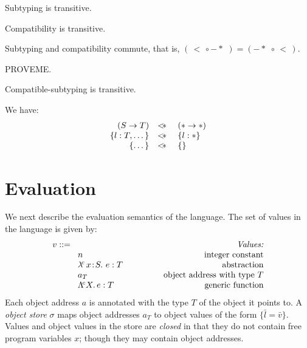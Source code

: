 \documentclass{article}
\newcommand{\myclearpage}{}
\renewcommand{\myclearpage}{\clearpage}
\newcommand{\lam}[5]{\lambda\!^{#1}\,#2\!:\!#3.\,\,#5:#4}
\newcommand{\lamt}[2]{#1\rightarrow #2}
\newcommand{\dynamic}{\t{*}}
\newcommand{\Lam}[4]{\Lambda\!^{#1} #2.\,#3:#4}
\newcommand{\subtypeword}{\,<\,}
\newcommand{\subtype}[2]{#1 \subtypeword #2}
\newcommand{\compatible}[2]{#1 \leadsto #2}
\renewcommand{\compatible}[2]{#1 -\!\!\!*\,\, #2}
\newcommand{\comsubtype}[2]{#1 <\!\!\leadsto #2}
\renewcommand{\comsubtype}[2]{#1 <\!\!\!*\,\, #2}
\renewcommand{\t}[1]{{\tt #1}}
\newcommand{\objty}[1]{\{#1\}}
\newcommand{\objv}[1]{\{#1\}}
\begin{document}
 
\begin{lemma}
Subtyping is transitive.
\end{lemma}
\begin{lemma}
Compatibility is transitive.
\end{lemma}
\begin{lemma}
Subtyping and compatibility commute, that is, $(\subtype{}{}\circ \compatible{}{} )=( \compatible{}{}\circ \subtype{}{})$.
\end{lemma}
PROVEME.
\begin{lemma}
Compatible-subtyping is transitive.
\end{lemma}


We have:
\[
\begin{array}{rcl}
	(\lamt{S}{T})  		&\comsubtype{}{}&  (\lamt\dynamic\dynamic) \\
	\objty{l:T,\dots}		& \comsubtype{}{}&  \objty{l:\dynamic} \\
	\objty{\dots}	   	& \comsubtype{}{}&  \objty{} \\
\end{array}
\]

\myclearpage
\section{Evaluation}

We next describe the evaluation semantics of the language. 
The set of values in the language is given by:
\[
\begin{array}{llr}
	\mydefhead{v ::=\qquad\qquad\qquad\qquad\qquad}{Values:} 
	\mydefcase{n								}{integer constant} 
	\mydefcase{\lam{c}{x}{S}{T}{e} 				}{abstraction} 
	\mydefcase{a_T							}{object address with type $T$}
	\mydefcase{\Lam c X e T						}{generic function}
\end{array}
\]
Each object address $a$ is annotated with the type $T$ of the object it points to.
A \emph{object store} $\sigma$ maps object addresses $a_T$ to object values of the form $\objv{\bar{l}=\bar v}$.
Values and object values in the store are \emph{closed} in that they do not contain free program variables $x$;
though they may contain object addresses.
\end{document}
